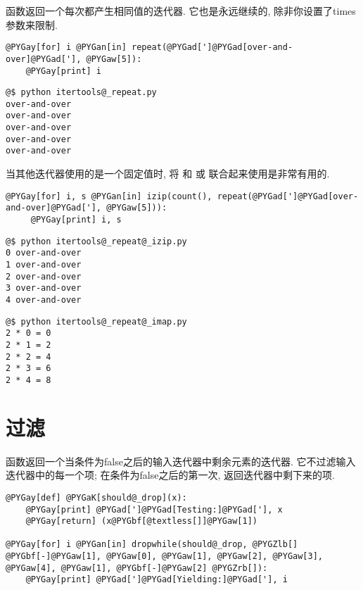 \documentclass[a4paper,10pt,english]{manual}
\begin{document}
 函数返回一个每次都产生相同值的迭代器. 它也是永远继续的, 除非你设置了times参数来限制.

\begin{Verbatim}[commandchars=@\[\]]
@PYGay[for] i @PYGan[in] repeat(@PYGad[']@PYGad[over-and-over]@PYGad['], @PYGaw[5]):
    @PYGay[print] i
\end{Verbatim}

\begin{Verbatim}[commandchars=@\[\]]
@$ python itertools@_repeat.py
over-and-over
over-and-over
over-and-over
over-and-over
over-and-over
\end{Verbatim}

当其他迭代器使用的是一个固定值时, 将  和  或  联合起来使用是非常有用的.

\begin{Verbatim}[commandchars=@\[\]]
@PYGay[for] i, s @PYGan[in] izip(count(), repeat(@PYGad[']@PYGad[over-and-over]@PYGad['], @PYGaw[5])):
     @PYGay[print] i, s
\end{Verbatim}

\begin{Verbatim}[commandchars=@\[\]]
@$ python itertools@_repeat@_izip.py
0 over-and-over
1 over-and-over
2 over-and-over
3 over-and-over
4 over-and-over
\end{Verbatim}

\begin{Verbatim}[commandchars=@\[\]]
@$ python itertools@_repeat@_imap.py
2 * 0 = 0
2 * 1 = 2
2 * 2 = 4
2 * 3 = 6
2 * 4 = 8
\end{Verbatim}


\section{过滤}

 函数返回一个当条件为false之后的输入迭代器中剩余元素的迭代器. 它不过滤输入迭代器中的每一个项; 在条件为false之后的第一次, 返回迭代器中剩下来的项.

\begin{Verbatim}[commandchars=@\[\]]
@PYGay[def] @PYGaK[should@_drop](x):
    @PYGay[print] @PYGad[']@PYGad[Testing:]@PYGad['], x
    @PYGay[return] (x@PYGbf[@textless[]]@PYGaw[1])

@PYGay[for] i @PYGan[in] dropwhile(should@_drop, @PYGZlb[] @PYGbf[-]@PYGaw[1], @PYGaw[0], @PYGaw[1], @PYGaw[2], @PYGaw[3], @PYGaw[4], @PYGaw[1], @PYGbf[-]@PYGaw[2] @PYGZrb[]):
    @PYGay[print] @PYGad[']@PYGad[Yielding:]@PYGad['], i
\end{Verbatim}
\end{document}

